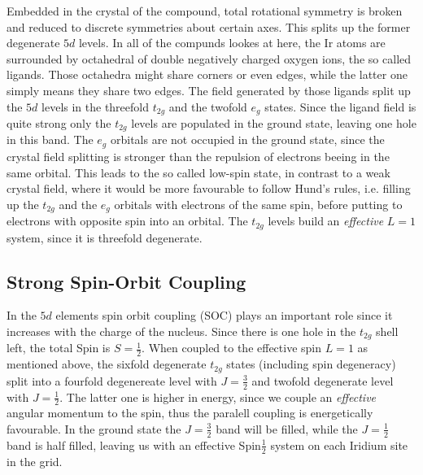 \documentclass[a4paper,10pt]{report}
\begin{document}
Embedded in the crystal of the compound, total rotational symmetry is broken and reduced to discrete symmetries about certain axes. 
This splits up the former degenerate $5d$ levels. 
In all of the compunds lookes at here, the $\mathrm{Ir}$ atoms are surrounded by octahedral of double negatively charged oxygen ions, the so called ligands. 
Those octahedra might share corners or even edges, while the latter one simply means they share two edges. 
%
%
The field generated by those ligands split up the $5d$ levels in the threefold $t_{2g}$ and the twofold $e_g$ states. 
Since the ligand field is quite strong
only the $t_{2g}$ levels are populated in the ground state, leaving one hole in this band. 
The $e_g$ orbitals are not occupied in the ground state, since the crystal field splitting is stronger than the repulsion of electrons beeing in the same orbital. 
This leads to the so called low-spin state, in contrast to a weak crystal field, 
where it would be more favourable to follow Hund's rules, 
i.e. filling up the $t_{2g}$ and the $e_g$ orbitals with electrons of the same spin, before putting to electrons with opposite spin into an orbital.
The $t_{2g}$ levels build an \emph{effective} $L=1$ system, since it is threefold degenerate.

\subsection{Strong Spin-Orbit Coupling}

In the $5d$ elements spin orbit coupling (SOC) plays an important role since it increases with the charge of the nucleus.
Since there is one hole in the $t_{2g}$ shell left, the total Spin is $S=\frac12$. 
When coupled to the effective spin $L=1$ as mentioned above, 
the sixfold degenerate $t_{2g}$ states (including spin degeneracy) split into a fourfold degenereate level with $J=\frac32$
and twofold degenerate level with $J=\frac12$. The latter one is higher in energy, since we couple an \emph{effective} angular momentum to the spin,
thus the paralell coupling is energetically favourable.
In the ground state the $J=\frac32$ band will be filled, while the $J=\frac12$ band is half filled, leaving us with an effective Spin$\frac12$ system on each Iridium site in the grid.
\end{document}
